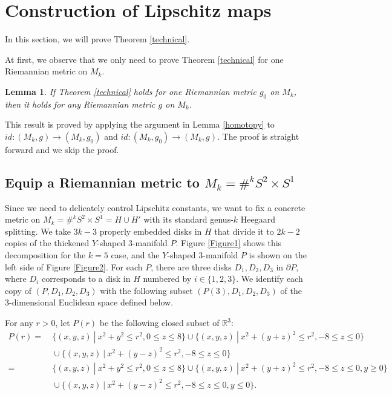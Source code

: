 \documentclass{amsart}
\newtheorem{lem}[thm]{Lemma}
\begin{document}
\section{Construction of Lipschitz maps}\label{technicalsection}
In this section,  we will prove Theorem \ref{technical}.

At first, we observe that we only need to prove Theorem \ref{technical} for one Riemannian metric on $M_k$. 

\begin{lem}\label{onemetric}
If Theorem \ref{technical} holds for one Riemannian metric $g_0$ on $M_k$, then it holds for any Riemannian metric $g$ on $M_k$.
\end{lem}

This result is proved by applying the argument in Lemma \ref{homotopy} to $id:(M_k,g)\to (M_k,g_0)$ and $id:(M_k,g_0)\to (M_k,g)$. The proof is straight forward and we skip the proof.



\subsection{Equip a Riemannian metric to $M_k=\#^kS^2\times S^1$}\label{equip}

Since we need to delicately control Lipschitz constants, we want to fix a  concrete metric on $M_k=\#^kS^2\times S^1=H\cup H'$ with its standard genus-$k$ Heegaard splitting. We take $3k-3$ properly embedded disks in $H$ that divide it to $2k-2$ copies of 
the thickened $Y$-shaped $3$-manifold $P$. Figure \ref{Figure1} shows this decomposition for the $k=5$ case, and the $Y$-shaped $3$-manifold $P$ is shown on the left side of Figure \ref{Figure2}. For each $P$, there are three disks $D_1, D_2, D_3$ in $\partial P$, where $D_i$ corresponds to a disk in $H$
numbered by $i\in \{1, 2, 3\}$.  We identify each copy of $(P, D_1, D_2, D_3)$ with the following subset $(P(3), D_1, D_2, D_3)$ of the 3-dimensional Euclidean space defined below.

For any $r>0$, let $P(r)$ be the following closed subset of $\mathbb{R}^3$:
\begin{equation}\label{Yshape}
\begin{aligned}
P(r)=&\ \{(x,y,z)\ |\ x^2+y^2\leq r^2, 0\leq z\leq 8\}\cup \{(x,y,z)\ |\ x^2+(y+z)^2\leq r^2,-8\leq z\leq 0\}\\
 &\ \cup \{(x,y,z)\ |\ x^2+(y-z)^2\leq r^2,-8\leq z\leq 0\}\\
 = &\ \{(x,y,z)\ |\ x^2+y^2\leq r^2, 0\leq z\leq 8\}\cup \{(x,y,z)\ |\ x^2+(y+z)^2\leq r^2,-8\leq z\leq 0, y\geq 0\}\\
 &\ \cup \{(x,y,z)\ |\ x^2+(y-z)^2\leq r^2,-8\leq z\leq 0, y\leq 0\}.
 \end{aligned}
 \end{equation}
\end{document}
